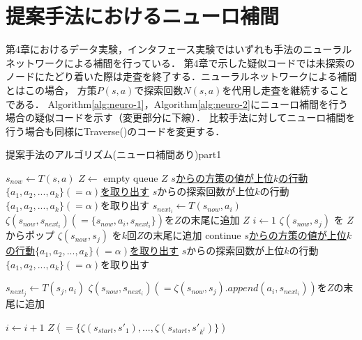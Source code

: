 \section{提案手法におけるニューロ補間}
第4章におけるデータ実験，インタフェース実験ではいずれも手法のニューラルネットワークによる補間を行っている．
第4章で示した疑似コードでは未探索のノードにたどり着いた際は走査を終了する．ニューラルネットワークによる補間とはこの場合，
方策$P(s, a)$で探索回数$N(s, a)$を代用し走査を継続することである．
Algorithm\ref{alg:neuro-1}，Algorithm\ref{alg:neuro-2}にニューロ補間を行う場合の疑似コードを示す（変更部分に下線）．
比較手法に対してニューロ補間を行う場合も同様にTraverse()のコードを変更する．
\begin{algorithm}
    \caption{提案手法のアルゴリズム(ニューロ補間あり)part1}
    \label{alg:neuro-1}
    \small
    \begin{algorithmic}[1]       
           \State $s_{now} \gets T(s, a)$
           \State $Z \gets $ empty queue
             \Return  $Z$
            \EndIf
             \State \underline{$s$からの方策の値が上位$k$の行動$\{a_1, a_2, ..., a_{k}\}(=\alpha)$を取り出す}
            \Else
             \State $s$からの探索回数が上位$k$の行動$\{a_1, a_2, ..., a_{k}\}(=\alpha)$を取り出す
            \EndIf
             \State $s_{{next}_i} \gets T(s_{now}, a_i)$
             \State $\zeta(s_{now},s_{{next}_i})(=\{s_{now}, a_i, s_{{next}_i}\})$を$Z$の末尾に追加
           \EndFor
             \Return $Z$
           \EndIf
           \State $i \gets 1$
                    \State $\zeta(s_{now}, s_{j})$ を $Z$からポップ
                        \State $\zeta(s_{now}, s_{j})$ を$k$回$Z$の末尾に追加
                        \State continue
                    \EndIf
                       \State \underline{$s$からの方策の値が上位$k$の行動$\{a_1, a_2, ..., a_{k}\}(=\alpha)$を取り出す}
                   \Else
                    \State $s$からの探索回数が上位$k$の行動$\{a_1, a_2, ..., a_{k}\}(=\alpha)$を取り出す
                   \EndIf
                    
                        \State $s_{{next}_j} \gets T(s_{j}, a_i)$
                        \State $\zeta(s_{now},s_{{next}_i})(=\zeta(s_{now}, s_{j}).append({a_i, s_{{next}_i}}))$を$Z$の末尾に追加
                    \EndFor
                    
                \EndFor 
                \State $i \gets i+1$
           \EndWhile
           \Return $Z(=\{\zeta(s_{start}, {s'}_1), ..., \zeta(s_{start}, {s'}_{k^l})\})$
        \EndFunction
    \end{algorithmic}
\end{algorithm}

